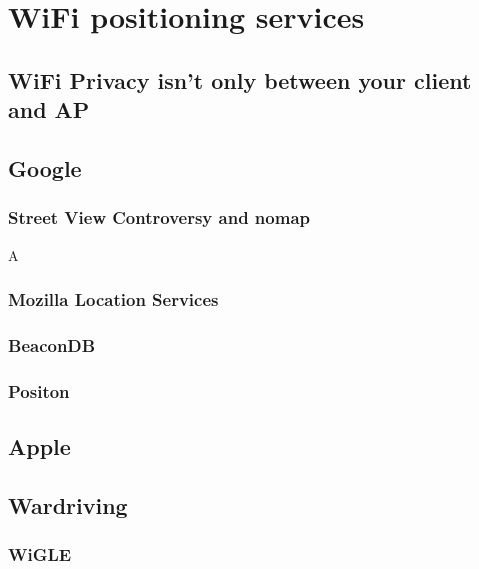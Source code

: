 \documentclass[../wifi-security.tex]{subfiles}
\begin{document}
\chapter{WiFi positioning services}

\section{WiFi Privacy isn't only between your client and AP}




\section{Google}




\subsection{Street View Controversy and nomap}

A

\subsection{Mozilla Location Services}




\subsection{BeaconDB}

\subsection{Positon}

\section{Apple}




\section{Wardriving}

\subsection{WiGLE}



\end{document}
